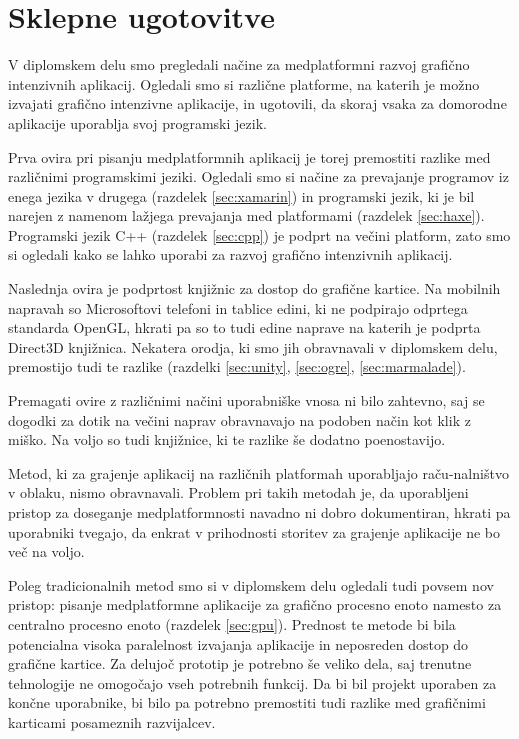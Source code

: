 \chapter{Sklepne ugotovitve}

V diplomskem delu smo pregledali načine za medplatformni razvoj grafično intenzivnih aplikacij. Ogledali smo si različne platforme, na katerih je možno izvajati grafično intenzivne aplikacije, in ugotovili, da skoraj vsaka za domorodne aplikacije uporablja svoj programski jezik. 

Prva ovira pri pisanju medplatformnih aplikacij je torej premostiti razlike med različnimi programskimi jeziki. Ogledali smo si načine za prevajanje programov iz enega jezika v drugega (razdelek \ref{sec:xamarin}) in programski jezik, ki je bil narejen z namenom lažjega prevajanja med platformami (razdelek \ref{sec:haxe}). Programski jezik C++ (razdelek \ref{sec:cpp}) je podprt na večini platform, zato smo si ogledali kako se lahko uporabi za razvoj grafično intenzivnih aplikacij.

Naslednja ovira je podprtost knjižnic za dostop do grafične kartice. Na mobilnih napravah so Microsoftovi telefoni in tablice edini, ki ne podpirajo odprtega standarda OpenGL, hkrati pa so to tudi edine naprave na katerih je podprta Direct3D knjižnica. Nekatera orodja, ki smo jih obravnavali v diplomskem delu, premostijo tudi te razlike (razdelki \ref{sec:unity}, \ref{sec:ogre}, \ref{sec:marmalade}).

Premagati ovire z različnimi načini uporabniške vnosa ni bilo zahtevno, saj se dogodki za dotik na večini naprav obravnavajo na podoben način kot klik z miško. Na voljo so tudi knjižnice, ki te razlike še dodatno poenostavijo.

Metod, ki za grajenje aplikacij na različnih platformah uporabljajo raču-nalništvo v oblaku, nismo obravnavali. Problem pri takih metodah je, da uporabljeni pristop za doseganje medplatformnosti navadno ni dobro dokumentiran, hkrati pa uporabniki tvegajo, da enkrat v prihodnosti storitev za grajenje aplikacije ne bo več na voljo.  

Poleg tradicionalnih metod smo si v diplomskem delu ogledali tudi povsem nov pristop: pisanje medplatformne aplikacije za grafično procesno enoto namesto za centralno procesno enoto (razdelek \ref{sec:gpu}). Prednost te metode bi bila potencialna visoka paralelnost izvajanja aplikacije in neposreden dostop do grafične kartice. Za delujoč prototip je potrebno še veliko dela, saj trenutne tehnologije ne omogočajo vseh potrebnih funkcij. Da bi bil projekt uporaben za končne uporabnike, bi bilo pa potrebno premostiti tudi razlike med grafičnimi karticami posameznih razvijalcev. 

